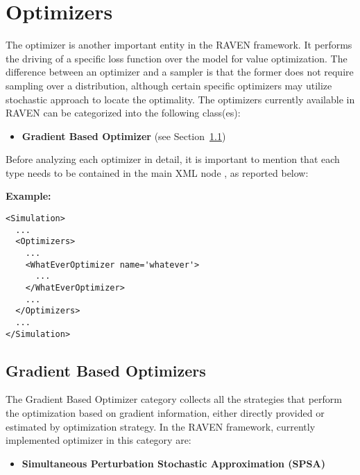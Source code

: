 \section{Optimizers}
\label{sec:Optimizers}

\renewcommand{\nameDescription}
{
  \xmlAttr{name},
  \xmlDesc{required string attribute}, user-defined name of this optimizer.
  \nb As with other objects, this identifier can be used to reference this
  specific entity from other input blocks in the XML.
}
\renewcommand{\specBlock}[2]
{
  The specifications of this optimizer must be defined within #1 \xmlNode{#2} XML
  block.
}


The optimizer is another important entity in the RAVEN framework. It performs the driving of a specific loss function over the model for value optimization. The difference between an optimizer and a sampler is that the former does not require sampling over a distribution, although certain specific optimizers may utilize stochastic approach to locate the optimality.
The optimizers currently available in RAVEN can be categorized into the following class(es):
\begin{itemize}
\item \textbf{Gradient Based Optimizer} (see Section~\ref{subsec:gradientBasedOptimizers})
\end{itemize}

Before analyzing each optimizer in detail, it is important to mention that each type needs to be contained in the main XML node , as reported below:

\textbf{Example:}

\begin{lstlisting}[style=XML]
<Simulation>
  ...
  <Optimizers>
    ...
    <WhatEverOptimizer name='whatever'>
      ...
    </WhatEverOptimizer>
    ...
  </Optimizers>
  ...
</Simulation>
\end{lstlisting}

\subsection{Gradient Based Optimizers}
\label{subsec:gradientBasedOptimizers}
The Gradient Based Optimizer category collects all the strategies that perform the optimization based on gradient information, either directly provided or estimated by optimization strategy. In the RAVEN framework, currently implemented optimizer in this category are:
\begin{itemize}
\item \textbf{Simultaneous Perturbation Stochastic Approximation (SPSA)}
\end{itemize}

